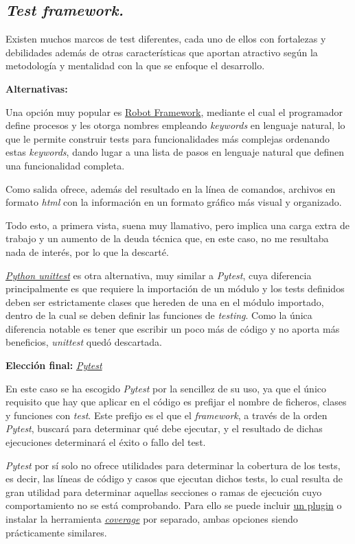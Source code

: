 \subsection{\textit{Test framework.}}

Existen muchos marcos de test diferentes, cada uno de ellos con fortalezas y debilidades además de otras características que aportan atractivo según la metodología y mentalidad con la que se enfoque el desarrollo.

\textbf{Alternativas:}

Una opción muy popular es \href{https://robotframework.org/}{Robot Framework}, mediante el cual el programador define procesos y les otorga nombres empleando \textit{keywords} en lenguaje natural, lo que le permite construir tests para funcionalidades más complejas ordenando estas \textit{keywords}, dando lugar a una lista de pasos en lenguaje natural que definen una funcionalidad completa.

Como salida ofrece, además del resultado en la línea de comandos, archivos en formato \textit{html} con la información en un formato gráfico más visual y organizado.

Todo esto, a primera vista, suena muy llamativo, pero implica una carga extra de trabajo y un aumento de la deuda técnica que, en este caso, no me resultaba nada de interés, por lo que la descarté.

\href{https://docs.python.org/3/library/unittest.html}{\textit{Python unittest}} es otra alternativa, muy similar a \textit{Pytest}, cuya diferencia principalmente es que requiere la importación de un módulo y los tests definidos deben ser estrictamente clases que hereden de una en el módulo importado, dentro de la cual se deben definir las funciones de \textit{testing}. Como la única diferencia notable es tener que escribir un poco más de código y no aporta más beneficios, \textit{unittest} quedó descartada.

\textbf{Elección final:} \href{https://docs.Pytest.org/}{\textit{Pytest}}

En este caso se ha escogido \textit{Pytest} por la sencillez de su uso, ya que el único requisito que hay que aplicar en el código es prefijar el nombre de ficheros, clases y funciones con \textit{test}. Este prefijo es el que el \textit{framework}, a través de la orden \textit{Pytest}, buscará para determinar qué debe ejecutar, y el resultado de dichas ejecuciones determinará el éxito o fallo del test.

\textit{Pytest} por sí solo no ofrece utilidades para determinar la cobertura de los tests, es decir, las líneas de código y casos que ejecutan dichos tests, lo cual resulta de gran utilidad para determinar aquellas secciones o ramas de ejecución cuyo comportamiento no se está comprobando. Para ello se puede incluir \href{https://pypi.org/project/pytest-cov/}{un plugin} o instalar la herramienta \href{https://coverage.readthedocs.io/}{\textit{coverage}} por separado, ambas opciones siendo prácticamente similares.


